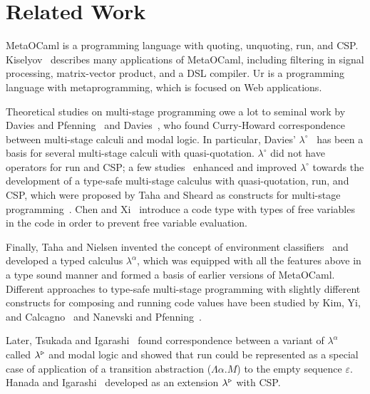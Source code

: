 
\section{Related Work}
\label{sec:related-work}


MetaOCaml is a programming language with quoting, unquoting, run, and CSP.
Kiselyov~\cite{8384206} describes many applications of MetaOCaml, including
filtering in signal processing, matrix-vector product, and a DSL compiler.
Ur\cite{chlipala2010ur} is a programming language with metaprogramming, which
is focused on Web applications.


Theoretical studies on multi-stage programming owe a lot to seminal work by
Davies and Pfenning~\cite{DaviesPfenning01JACM} and
Davies~\cite{davies1996temporal}, who found Curry-Howard correspondence
between multi-stage calculi and modal logic. In particular, Davies'
$\lambda^\circ$~\cite{davies1996temporal} has been a basis for several
multi-stage calculi with quasi-quotation. $\lambda^\circ$ did not have
operators for run and CSP; a few
studies~\cite{benaissa1999logical,MoggiTahaBenaissaSheard99ESOP} enhanced and
improved $\lambda^\circ$ towards the development of a type-safe multi-stage
calculus with quasi-quotation, run, and CSP, which were proposed by Taha and
Sheard as constructs for multi-stage programming~\cite{MetaML}. Chen and
Xi~\cite{chen2003meta} introduce a code type with types of free variables in
the code in order to prevent free variable evaluation. 

Finally, Taha and Nielsen invented the concept of environment
classifiers~\cite{taha2003environment} and developed a typed calculus
$\lambda^\alpha$, which was equipped with all the features above in a type
sound manner and formed a basis of earlier versions of MetaOCaml. Different
approaches to type-safe multi-stage programming with slightly different
constructs for composing and running code values have been studied by Kim,
Yi, and Calcagno~\cite{DBLP:conf/popl/KimYC06} and Nanevski and
Pfenning~\cite{DBLP:journals/jfp/NanevskiP05}.

Later, Tsukada and Igarashi~\cite{Tsukada} found correspondence
between a variant of \(\lambda^\alpha\) called $\lambda^{\mathop{\triangleright}}$
and modal logic and showed that run could be represented as a special
case of application of a transition abstraction ($\Lambda\alpha.M$) to
the empty sequence $\varepsilon$.  Hanada and
Igarashi~\cite{Hanada2014} developed \LTP as an extension
$\lambda^{\mathop{\triangleright}}$ with CSP.

